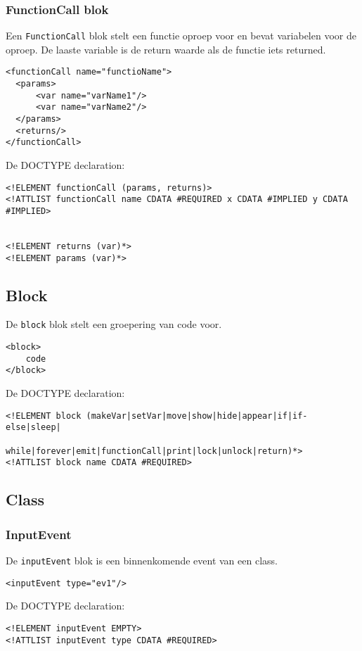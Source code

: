 \documentclass[]{article}
\begin{document}
\subsubsection{FunctionCall blok}
Een \texttt{FunctionCall} blok stelt een functie oproep voor en bevat variabelen voor de oproep.
De laaste variable is de return waarde als de functie iets returned.
\lstset{language=XML}
\begin{lstlisting}
<functionCall name="functioName">
  <params>
      <var name="varName1"/>
      <var name="varName2"/>
  </params>
  <returns/>
</functionCall>
\end{lstlisting}
De DOCTYPE declaration: 
\lstset{language=XML}
\begin{lstlisting}
<!ELEMENT functionCall (params, returns)>
<!ATTLIST functionCall name CDATA #REQUIRED x CDATA #IMPLIED y CDATA #IMPLIED>


<!ELEMENT returns (var)*>
<!ELEMENT params (var)*>
\end{lstlisting}

\subsection{Block}
De \texttt{block} blok stelt een groepering van code voor. 
\lstset{language=XML}
\begin{lstlisting}
<block>
	code
</block>
\end{lstlisting}
De DOCTYPE declaration: 
\lstset{language=XML}
\begin{lstlisting}
<!ELEMENT block (makeVar|setVar|move|show|hide|appear|if|if-else|sleep|
			while|forever|emit|functionCall|print|lock|unlock|return)*>
<!ATTLIST block name CDATA #REQUIRED>
\end{lstlisting}

\subsection{Class}
\subsubsection{InputEvent}
De \texttt{inputEvent} blok is een binnenkomende event van een class.
\lstset{language=XML}
\begin{lstlisting}
<inputEvent type="ev1"/>
\end{lstlisting}
De DOCTYPE declaration: 
\lstset{language=XML}
\begin{lstlisting}
<!ELEMENT inputEvent EMPTY>
<!ATTLIST inputEvent type CDATA #REQUIRED>
\end{lstlisting}
\end{document}
